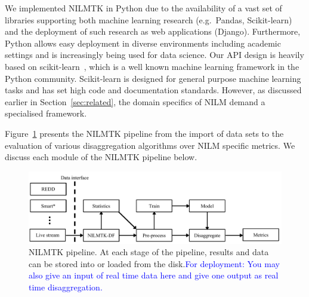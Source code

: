 \documentclass{sig-alternate}
\newcommand{\bluecolor}[1]{\textcolor{blue}{#1}}
\newcommand{\figref}[1]{Figure~\ref{#1}}
\newcommand{\secref}[1]{Section~\ref{#1}}
\begin{document}

We implemented NILMTK in Python due to the availability of a vast set of libraries supporting both machine learning research (e.g.\ Pandas, Scikit-learn) and the deployment of such research as web applications (Django). Furthermore, Python allows easy deployment in diverse environments including academic settings and is increasingly being used for data science.
Our API design is heavily based on scikit-learn~\cite{scikit, scikit_api}, which is a well known machine learning framework in the Python community. Scikit-learn is designed for general purpose machine learning tasks and has set high code and documentation standards. However, as discussed earlier in \secref{sec:related}, the domain specifics of NILM demand a specialised framework. 

\figref{fig:pipeline} presents the NILMTK pipeline from the import of data sets to the evaluation of various disaggregation algorithms over NILM specific metrics. We discuss each module of the NILMTK pipeline below.

\begin{figure}
\centering \includegraphics[scale=0.7]{figures/pipeline.pdf}
\caption{NILMTK pipeline. At each stage of the pipeline, results and data can be stored into or loaded from the disk.\bluecolor{For deployment: You may also give an input of real time data here and give one output as real time disaggregation.}}
\label{fig:pipeline}
\end{figure}
\end{document}
